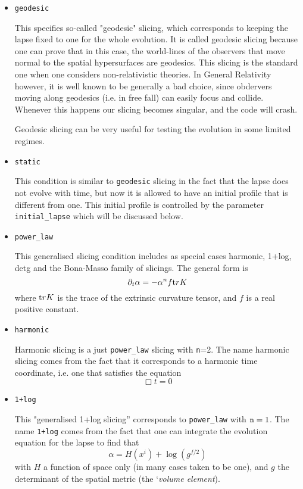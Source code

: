 \documentclass{article}
\begin{document}
\begin{itemize}

\item{\tt geodesic}

This specifies so-called "geodesic" slicing, which corresponds 
to keeping the lapse fixed to one for the whole evolution. It is called geodesic slicing
because one can prove that in this case, the world-lines of the observers that move
normal to the spatial hypersurfaces are geodesics. This slicing
is the standard one when one considers non-relativistic theories.
In General Relativity however, it is well known to be generally a bad choice, 
since obdervers moving along geodesics (i.e. in free fall) can
easily focus and collide. Whenever this happens our slicing
becomes singular, and the code will crash.

Geodesic slicing can be very useful for testing the evolution in
some limited regimes.

\item{\tt static}

This condition is similar to {\tt geodesic} slicing in the
fact that the lapse does not evolve with time, but now it is allowed
to have an initial profile that is different from one. This
initial profile is controlled by the parameter 
{\tt initial\_lapse} which will be discussed below.

\item{\tt power\_law}

This generalised slicing condition includes as special cases
harmonic, 1+log, detg and the Bona-Masso family of slicings. 
The general form is
$$
\partial_t \alpha = - \alpha^n f {\mbox tr} K
$$
where ${\mbox tr}K$ is the trace of the extrinsic curvature tensor,
and $f$ is a real positive constant.

\item{\tt harmonic}

Harmonic slicing is a just {\tt power\_law} slicing with {\tt n}=2.
The name harmonic slicing comes from the fact that it 
corresponds to a harmonic time coordinate,
i.e. one that satisfies the equation
$$
\Box t = 0
$$

\item{\tt 1+log}

This "generalised 1+log slicing'' corresponds to
{\tt power\_law} with ${\tt n}=1$. The name {\tt 1+log}
comes from the fact that one can integrate
the evolution equation for the lapse to find that
$$
\alpha = H(x^i) + \log(g^{f/2})
$$
with $H$ a function of space only (in many cases taken to be one),
and $g$ the determinant of the spatial metric (the `{\it volume
element}).



\end{itemize}
\end{document}
